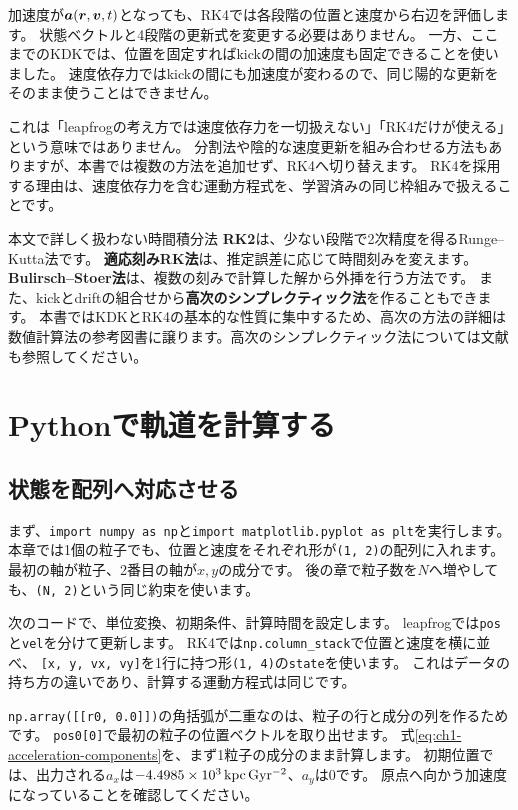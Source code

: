 加速度が$\boldsymbol a(\boldsymbol r,\boldsymbol v,t)$となっても、RK4では各段階の位置と速度から右辺を評価します。
状態ベクトルと4段階の更新式を変更する必要はありません。
一方、ここまでのKDKでは、位置を固定すればkickの間の加速度も固定できることを使いました。
速度依存力ではkickの間にも加速度が変わるので、同じ陽的な更新をそのまま使うことはできません。

これは「leapfrogの考え方では速度依存力を一切扱えない」「RK4だけが使える」という意味ではありません。
分割法や陰的な速度更新を組み合わせる方法もありますが、本書では複数の方法を追加せず、RK4へ切り替えます。
RK4を採用する理由は、速度依存力を含む運動方程式を、学習済みの同じ枠組みで扱えることです。

\begin{notebox}{本文で詳しく扱わない時間積分法}
\textbf{RK2}は、少ない段階で2次精度を得るRunge--Kutta法です。
\textbf{適応刻みRK法}は、推定誤差に応じて時間刻みを変えます。
\textbf{Bulirsch--Stoer法}は、複数の刻みで計算した解から外挿を行う方法です。
また、kickとdriftの組合せから\textbf{高次のシンプレクティック法}を作ることもできます。
本書ではKDKとRK4の基本的な性質に集中するため、高次の方法の詳細は数値計算法の参考図書に譲ります。高次のシンプレクティック法については文献\cite{simten2007}も参照してください。
\end{notebox}

\section{Pythonで軌道を計算する}
\label{sec:ch1-python}

\subsection{状態を配列へ対応させる}

まず、\verb|import numpy as np|と\verb|import matplotlib.pyplot as plt|を実行します。
本章では1個の粒子でも、位置と速度をそれぞれ形が\verb|(1, 2)|の配列に入れます。
最初の軸が粒子、2番目の軸が$x,y$の成分です。
後の章で粒子数を$N$へ増やしても、\verb|(N, 2)|という同じ約束を使います。

次のコードで、単位変換、初期条件、計算時間を設定します。
leapfrogでは\verb|pos|と\verb|vel|を分けて更新します。
RK4では\verb|np.column_stack|で位置と速度を横に並べ、
\verb|[x, y, vx, vy]|を1行に持つ形\verb|(1, 4)|の\verb|state|を使います。
これはデータの持ち方の違いであり、計算する運動方程式は同じです。

\verb|np.array([[r0, 0.0]])|の角括弧が二重なのは、粒子の行と成分の列を作るためです。
\verb|pos0[0]|で最初の粒子の位置ベクトルを取り出せます。
式\eqref{eq:ch1-acceleration-components}を、まず1粒子の成分のまま計算します。
初期位置では、出力される$a_x$は$-4.4985\times 10^{3}\,\mathrm{kpc\,Gyr^{-2}}$、$a_y$は0です。
原点へ向かう加速度になっていることを確認してください。

